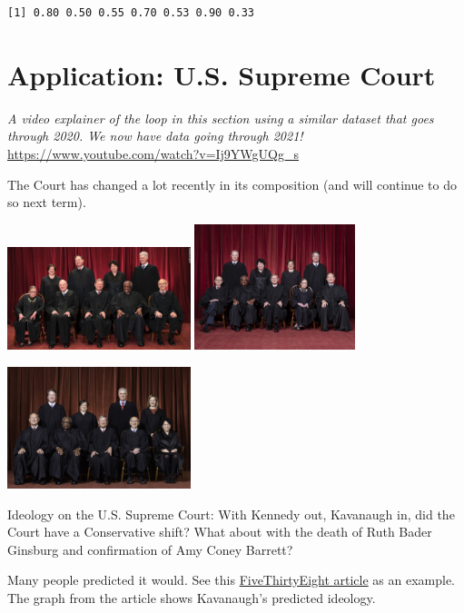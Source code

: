 \documentclass[
  letterpaper,
  DIV=11,
  numbers=noendperiod]{scrreprt}
\begin{document}
\begin{verbatim}
[1] 0.80 0.50 0.55 0.70 0.53 0.90 0.33
\end{verbatim}

\hypertarget{application-u.s.-supreme-court}{%
\section{Application: U.S. Supreme
Court}\label{application-u.s.-supreme-court}}

\emph{A video explainer of the loop in this section using a similar
dataset that goes through 2020. We now have data going through 2021!}
\url{https://www.youtube.com/watch?v=Ij9YWgUQg_s}

The Court has changed a lot recently in its composition (and will
continue to do so next term).

\includegraphics[width=0.4\textwidth,height=\textheight]{images/sccourt6.jpeg}
\includegraphics[width=0.35\textwidth,height=\textheight]{images/sccourt.jpg}

\includegraphics[width=0.4\textwidth,height=\textheight]{images/sccourt5.jpeg}

Ideology on the U.S. Supreme Court: With Kennedy out, Kavanaugh in, did
the Court have a Conservative shift? What about with the death of Ruth
Bader Ginsburg and confirmation of Amy Coney Barrett?

Many people predicted it would. See this
\href{https://fivethirtyeight.com/features/how-kavanaugh-will-change-the-supreme-court/}{FiveThirtyEight
article} as an example. The graph from the article shows Kavanaugh's
predicted ideology.
\end{document}
